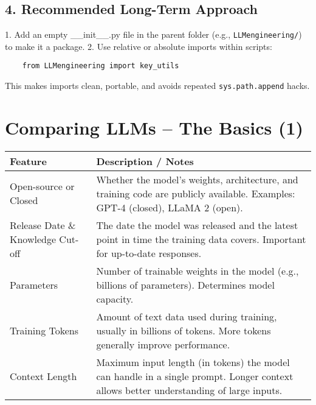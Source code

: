 \documentclass[a4paper, 12pt]{article}
\begin{document}
\subsection*{4. Recommended Long-Term Approach}

1. Add an empty \_\_init\_\_.py file in the parent folder (e.g., \texttt{LLMengineering/}) to make it a package.
2. Use relative or absolute imports within scripts:

\begin{tcolorbox}[colback=gray!5, colframe=gray!80!black, title=Long-Term Package Approach]
    \begin{verbatim}
    from LLMengineering import key_utils
    \end{verbatim}
\end{tcolorbox}

This makes imports clean, portable, and avoids repeated \texttt{sys.path.append} hacks.



\newpage
\section*{Comparing LLMs -- The Basics (1)}
\begin{tabularx}{\textwidth}{|>{\hsize}L|>{\hsize}L|}
\hline
\textbf{Feature} & \textbf{Description / Notes} \\
\hline
Open-source or Closed & Whether the model’s weights, architecture, and training code are publicly available. Examples: GPT-4 (closed), LLaMA 2 (open). \\
\hline
Release Date \& Knowledge Cut-off & The date the model was released and the latest point in time the training data covers. Important for up-to-date responses. \\
\hline
Parameters & Number of trainable weights in the model (e.g., billions of parameters). Determines model capacity. \\
\hline
Training Tokens & Amount of text data used during training, usually in billions of tokens. More tokens generally improve performance. \\
\hline
Context Length & Maximum input length (in tokens) the model can handle in a single prompt. Longer context allows better understanding of large inputs. \\
\hline
\end{tabularx}
\end{document}
